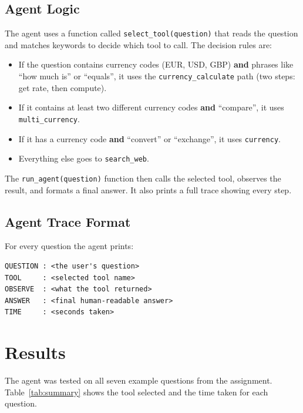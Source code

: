 \documentclass[11pt,a4paper]{article}
\begin{document}
\subsection{Agent Logic}

The agent uses a function called \texttt{select\_tool(question)} that reads the question and matches keywords to decide which tool to call. The decision rules are:

\begin{itemize}
    \item If the question contains currency codes (EUR, USD, GBP) \textbf{and} phrases like ``how much is'' or ``equals'', it uses the \texttt{currency\_calculate} path (two steps: get rate, then compute).
    \item If it contains at least two different currency codes \textbf{and} ``compare'', it uses \texttt{multi\_currency}.
    \item If it has a currency code \textbf{and} ``convert'' or ``exchange'', it uses \texttt{currency}.
    \item Everything else goes to \texttt{search\_web}.
\end{itemize}

The \texttt{run\_agent(question)} function then calls the selected tool, observes the result, and formats a final answer. It also prints a full trace showing every step.

\subsection{Agent Trace Format}

For every question the agent prints:

\begin{lstlisting}
QUESTION : <the user's question>
TOOL     : <selected tool name>
OBSERVE  : <what the tool returned>
ANSWER   : <final human-readable answer>
TIME     : <seconds taken>
\end{lstlisting}

\section{Results}

The agent was tested on all seven example questions from the assignment. Table~\ref{tab:summary} shows the tool selected and the time taken for each question.
\end{document}

